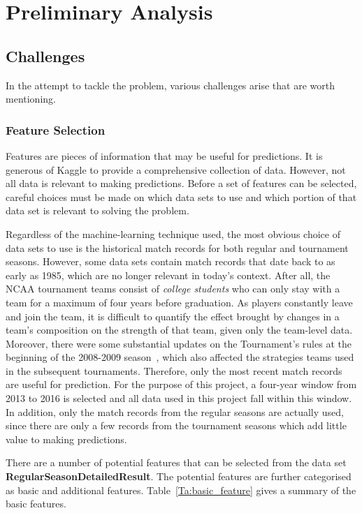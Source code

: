 \chapter{Preliminary Analysis}\label{Chap:2}

\section{Challenges}

In the attempt to tackle the problem, various challenges arise that are worth mentioning.

\subsection{Feature Selection}\label{SSec: features}

Features are pieces of information that may be useful for predictions. It is generous of Kaggle to provide a comprehensive collection of data. However, not all data is relevant to making predictions. Before a set of features can be selected, careful choices must be made on which data sets to use and which portion of that data set is relevant to solving the problem. 

Regardless of the machine-learning technique used, the most obvious choice of data sets to use is the historical match records for both regular and tournament seasons. However, some data sets contain match records that date back to as early as 1985, which are no longer relevant in today's context. After all, the NCAA tournament teams consist of \emph{college students} who can only stay with a team for a maximum of four years before graduation. As players constantly leave and join the team, it is difficult to quantify the effect brought by changes in a team's composition on the strength of that team, given only the team-level data. Moreover, there were some substantial updates on the Tournament's rules at the beginning of the 2008-2009 season~\cite{NP15}, which also affected the strategies teams used in the subsequent tournaments. Therefore, only the most recent match records are useful for prediction. For the purpose of this project, a four-year window from 2013 to 2016 is selected and all data used in this project fall within this window. In addition, only the match records from the regular seasons are actually used, since there are only a few records from the tournament seasons which add little value to making predictions. 

There are a number of potential features that can be selected from the data set \textbf{RegularSeasonDetailedResult}. The potential features are further categorised as basic and additional features. Table~\ref{Ta:basic_feature} gives a summary of the basic features. 

